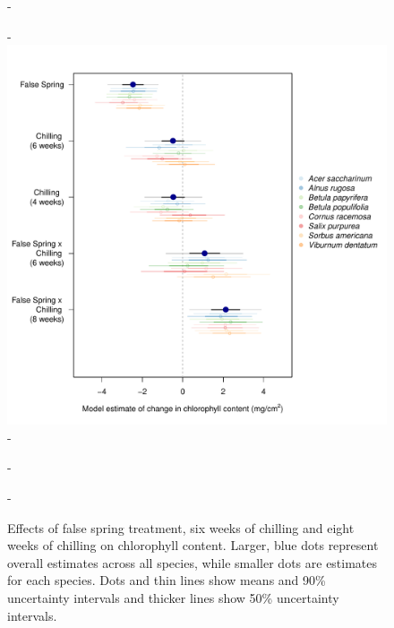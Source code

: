 \documentclass{article}\usepackage[]{graphicx}\usepackage[]{color}
\begin{document}
{\begin{figure} [H]
  -\begin{center}
  -\includegraphics[width=14cm]{..//analyses/figures/chl50and90_brms.pdf} 
  -\caption{Effects of false spring treatment, six weeks of chilling and eight weeks of chilling on chlorophyll content. Larger, blue dots represent overall estimates across all species, while smaller dots are estimates for each species. Dots and thin lines show means and 90\% uncertainty intervals and thicker lines show 50\% uncertainty intervals. }\label{fig:muchl}
  -\end{center}
  -\end{figure}}
\end{document}
